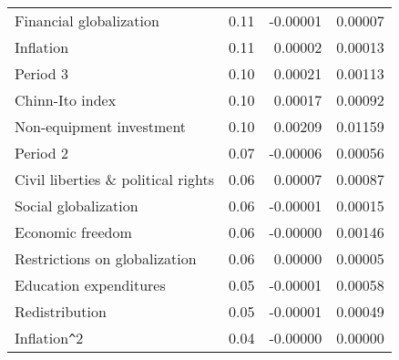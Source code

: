 \documentclass[a4paper,11pt]{article}
\begin{document}
\begin{table}[!ht]
\begin{tabular}{lrrr}
  Financial globalization & 0.11 & -0.00001 & 0.00007 \\
  Inflation & 0.11 & 0.00002 & 0.00013 \\
  Period 3 & 0.10 & 0.00021 & 0.00113 \\ 
  Chinn-Ito index & 0.10 & 0.00017 & 0.00092 \\
  Non-equipment investment & 0.10 & 0.00209 & 0.01159 \\ 
  Period 2 & 0.07 & -0.00006 & 0.00056 \\
  Civil liberties \& political rights & 0.06 & 0.00007 & 0.00087 \\
  Social globalization & 0.06 & -0.00001 & 0.00015 \\
  Economic freedom & 0.06 & -0.00000 & 0.00146 \\ 
  Restrictions on globalization & 0.06 & 0.00000 & 0.00005 \\
  Education expenditures & 0.05 & -0.00001 & 0.00058 \\
  Redistribution & 0.05 & -0.00001 & 0.00049 \\ 
  Inflation\verb|^|2 & 0.04 & -0.00000 & 0.00000 \\
    \end{tabular}
    \end{table}
%
\clearpage
%
\end{document}

